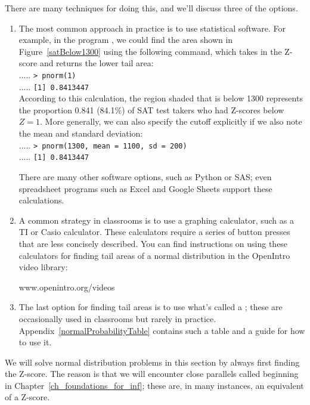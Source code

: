 There are many techniques for doing this, and we'll discuss
three of the options.
\begin{enumerate}
\item
    The most common approach in practice is to use
    statistical software.
    For example, in the program \R{}, we could find the area
    shown in Figure~\ref{satBelow1300} using the
    following command, which takes in the Z-score
    and returns the lower tail area: \\
    {\color{white}.....}%
        \texttt{> pnorm(1)} \\
    {\color{white}.....}%
        \texttt{[1] 0.8413447} \\
    According to this calculation,
    the region shaded that is below 1300
    represents the proportion 0.841 (84.1\%) of SAT test
    takers who had Z-scores below $Z = 1$.
    More generally, we can also specify the cutoff explicitly
    if we also note the mean and standard deviation: \\
    {\color{white}.....}%
        \texttt{> pnorm(1300, mean = 1100, sd = 200)} \\
    {\color{white}.....}%
        \texttt{[1] 0.8413447} %


    There are many other software options, such as Python or SAS;
    even spreadsheet programs such as
    Excel and Google Sheets support these calculations.
\item
    A common strategy in classrooms is to use a graphing
    calculator, such as a TI or Casio calculator.
    These calculators require a series of button presses
    that are less concisely described.
    You can find instructions on using these calculators
    for finding tail areas of a normal distribution in the
    OpenIntro video library:
    \begin{center}
        {www.openintro.org/videos}
    \end{center}
\item
    The last option for finding tail areas is to use
    what's called a ;
    these are occasionally used in classrooms
    but rarely in practice.
    Appendix~\ref{normalProbabilityTable}
    contains such a table and a guide for how to use it.
\end{enumerate}
We will solve normal distribution problems in this section
by always first finding the Z-score.
The reason is that we will encounter close parallels
called 
beginning in Chapter~\ref{ch_foundations_for_inf};
these are, in many instances, an equivalent of a Z-score.

